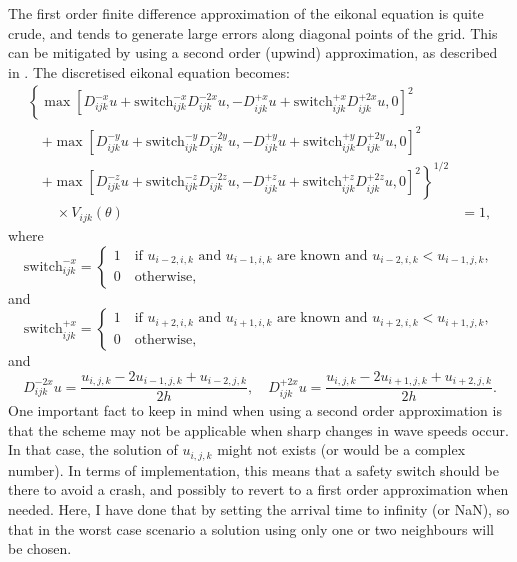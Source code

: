 \documentclass{article}
\begin{document}
The first order finite difference approximation of the eikonal equation is quite crude, and tends to generate large errors along diagonal points of the grid. This can be mitigated by using a second order (upwind) approximation, as described in \citet{sethian99}. The discretised eikonal equation becomes:
\begin{align}
  \left\{ \max\left[D^{-x}_{ijk}u + \mathrm{switch}_{ijk}^{-x}D^{-2x}_{ijk}u, -D^{+x}_{ijk}u + \mathrm{switch}_{ijk}^{+x}D^{+2x}_{ijk}u, 0\right]^2 \right. &\nonumber \\
  \quad \left. + \max\left[D^{-y}_{ijk}u + \mathrm{switch}_{ijk}^{-y}D^{-2y}_{ijk}u, -D^{+y}_{ijk}u + \mathrm{switch}_{ijk}^{+y}D^{+2y}_{ijk}u, 0\right]^2 \right. & \nonumber \\
  \quad \left. + \max\left[D^{-z}_{ijk}u + \mathrm{switch}_{ijk}^{-z}D^{-2z}_{ijk}u, -D^{+z}_{ijk}u + \mathrm{switch}_{ijk}^{+z}D^{+2z}_{ijk}u, 0\right]^2 \right\}^{1/2}& \nonumber\\
\qquad \times V_{ijk}(\theta) & = 1 \label{eq:eikonal_discr_2},
\end{align}
where
\begin{equation}
  \mathrm{switch}_{ijk}^{-x}=\left\{\begin{array}{l}
  1 \quad \text{if } u_{i-2,i,k} \text{ and } u_{i-1,i,k} \text{ are known and }u_{i-2,i,k}<u_{i-1,j,k},\\
  0 \quad \text{otherwise},\end{array}\right.
\end{equation}
and
\begin{equation}
\mathrm{switch}_{ijk}^{+x}=\left\{\begin{array}{l}
  1 \quad \text{if } u_{i+2,i,k} \text{ and } u_{i+1,i,k} \text{ are known and }u_{i+2,i,k}<u_{i+1,j,k},\\
  0 \quad \text{otherwise},\end{array}\right.
\end{equation}
and
\begin{equation}
  D^{-2x}_{ijk}u = \frac{u_{i,j,k} - 2u_{i-1,j,k} + u_{i-2,j,k}}{2h}, \quad D^{+2x}_{ijk}u = \frac{u_{i,j,k} - 2u_{i+1,j,k} + u_{i+2,j,k}}{2h}.
\end{equation}
One important fact to keep in mind when using a second order approximation is that the scheme may not be applicable when sharp changes in wave speeds occur. In that case, the solution of $u_{i,j,k}$ might not exists (or would be a complex number). In terms of implementation, this means that a safety switch should be there to avoid a crash, and possibly to revert to a first order approximation when needed. Here, I have done that by setting the arrival time to infinity (or NaN), so that in the worst case scenario a solution using only one or two neighbours will be chosen.
\end{document}
